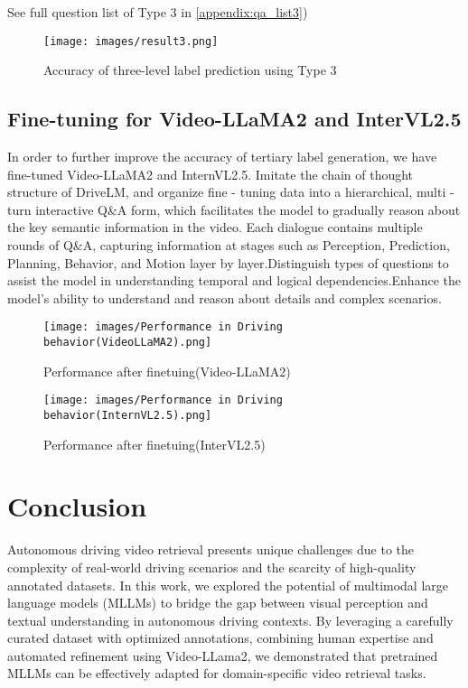\documentclass[lettersize,journal]{IEEEtran}
\begin{document}
See full question list of Type 3 in \ref{appendix:qa_list3})

\begin{figure}
    \centering
    \texttt{[image: images/result3.png]}
    \caption{Accuracy of three-level label prediction using Type 3}
    \label{fig:5}
\end{figure}


\subsection{Fine-tuning for Video-LLaMA2 and InterVL2.5}
In order to further improve the accuracy of tertiary label generation, we have fine-tuned Video-LLaMA2 and InternVL2.5. Imitate the chain of thought structure of DriveLM, and organize fine - tuning data into a hierarchical, multi - turn interactive Q\&A form, which facilitates the model to gradually reason about the key semantic information in the video. Each dialogue contains multiple rounds of Q\&A, capturing information at stages such as Perception, Prediction, Planning, Behavior, and Motion layer by layer.Distinguish types of questions to assist the model in understanding temporal and logical dependencies.Enhance the model's ability to understand and reason about details and complex scenarios.

\begin{figure}
    \centering
    \texttt{[image: images/Performance in Driving behavior(VideoLLaMA2).png]}
    \caption{Performance after finetuing(Video-LLaMA2)}
    \label{fig:6}
\end{figure}

\begin{figure}
    \centering
    \texttt{[image: images/Performance in Driving behavior(InternVL2.5).png]}
    \caption{Performance after finetuing(InterVL2.5)}
    \label{fig:7}
\end{figure}

\section{Conclusion}

Autonomous driving video retrieval presents unique challenges due to the complexity of real-world driving scenarios and the scarcity of high-quality annotated datasets. In this work, we explored the potential of multimodal large language models (MLLMs) to bridge the gap between visual perception and textual understanding in autonomous driving contexts. By leveraging a carefully curated dataset with optimized annotations, combining human expertise and automated refinement using Video-LLama2, we demonstrated that pretrained MLLMs can be effectively adapted for domain-specific video retrieval tasks.
\end{document}
